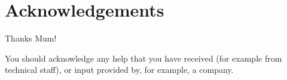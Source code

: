 \chapter*{\Huge{Acknowledgements}}
Thanks Mum!

You should acknowledge any help that you have received (for example from technical staff), or input provided by, for example, a company.

\newpage
